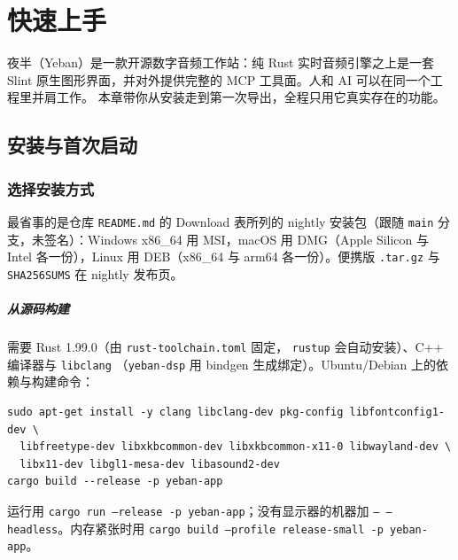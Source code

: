 
\chapter{快速上手}
\label{ch:quickstart}






夜半（Yeban）是一款开源数字音频工作站：纯 Rust 实时音频引擎之上是一套 Slint
原生图形界面，并对外提供完整的 MCP 工具面。人和 AI 可以在同一个工程里并肩工作。
本章带你从安装走到第一次导出，全程只用它真实存在的功能。

\section{安装与首次启动}

\subsection{选择安装方式}

最省事的是仓库 \texttt{README.md} 的 Download 表所列的 nightly 安装包（跟随
\texttt{main} 分支，未签名）：Windows x86\_64 用 MSI，macOS 用 DMG（Apple Silicon
与 Intel 各一份），Linux 用 DEB（x86\_64 与 arm64 各一份）。便携版
\texttt{.tar.gz} 与 \texttt{SHA256SUMS} 在 nightly 发布页。

\paragraph{从源码构建} 需要 Rust 1.99.0（由 \texttt{rust-toolchain.toml} 固定，
\texttt{rustup} 会自动安装）、C++ 编译器与 \texttt{libclang}
（\texttt{yeban-dsp} 用 bindgen 生成绑定）。Ubuntu/Debian 上的依赖与构建命令：

\begin{verbatim}
sudo apt-get install -y clang libclang-dev pkg-config libfontconfig1-dev \
  libfreetype-dev libxkbcommon-dev libxkbcommon-x11-0 libwayland-dev \
  libx11-dev libgl1-mesa-dev libasound2-dev
cargo build --release -p yeban-app
\end{verbatim}

运行用 \texttt{cargo run --release -p yeban-app}；没有显示器的机器加
\texttt{-- --headless}。内存紧张时用
\texttt{cargo build --profile release-small -p yeban-app}。


